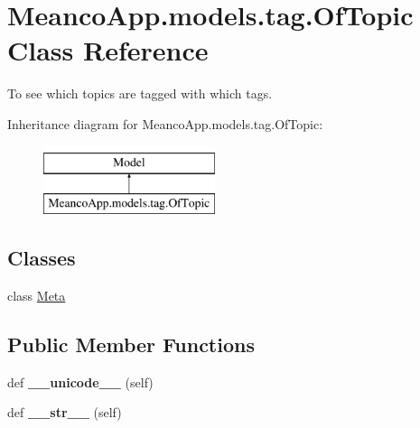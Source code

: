 \hypertarget{class_meanco_app_1_1models_1_1tag_1_1_of_topic}{}\section{Meanco\+App.\+models.\+tag.\+Of\+Topic Class Reference}
\label{class_meanco_app_1_1models_1_1tag_1_1_of_topic}


To see which topics are tagged with which tags.  


Inheritance diagram for Meanco\+App.\+models.\+tag.\+Of\+Topic\+:\begin{figure}[H]
\begin{center}
\leavevmode
\includegraphics[height=2.000000cm]{class_meanco_app_1_1models_1_1tag_1_1_of_topic}
\end{center}
\end{figure}
\subsection*{Classes}
\begin{DoxyCompactItemize}
\item 
class \hyperlink{class_meanco_app_1_1models_1_1tag_1_1_of_topic_1_1_meta}{Meta}
\end{DoxyCompactItemize}
\subsection*{Public Member Functions}
\begin{DoxyCompactItemize}
\item 
\hypertarget{class_meanco_app_1_1models_1_1tag_1_1_of_topic_acc8753e3a77e9fe21b44914a17c3303d}{}\label{class_meanco_app_1_1models_1_1tag_1_1_of_topic_acc8753e3a77e9fe21b44914a17c3303d} 
def {\bfseries \+\_\+\+\_\+unicode\+\_\+\+\_\+} (self)
\item 
\hypertarget{class_meanco_app_1_1models_1_1tag_1_1_of_topic_a69fea8db1238eba9d2c8cf6d4d3a067f}{}\label{class_meanco_app_1_1models_1_1tag_1_1_of_topic_a69fea8db1238eba9d2c8cf6d4d3a067f} 
def {\bfseries \+\_\+\+\_\+str\+\_\+\+\_\+} (self)
\end{DoxyCompactItemize}
